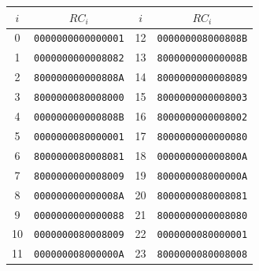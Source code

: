 \begin{tabular}{|c|c||c|c|}
\hline
\cellcolor{gray!30}$i$ & \cellcolor{gray!30}$RC_i$ & \cellcolor{gray!30}$i$ & \cellcolor{gray!30}$RC_i$ \\ \hline
0 & \texttt{0000000000000001} & 12 & \texttt{000000008000808B} \\ \hline
1 & \texttt{0000000000008082} & 13 & \texttt{800000000000008B} \\ \hline
2 & \texttt{800000000000808A} & 14 & \texttt{8000000000008089} \\ \hline
3 & \texttt{8000000080008000} & 15 & \texttt{8000000000008003} \\ \hline
4 & \texttt{000000000000808B} & 16 & \texttt{8000000000008002} \\ \hline
5 & \texttt{0000000080000001} & 17 & \texttt{8000000000000080} \\ \hline
6 & \texttt{8000000080008081} & 18 & \texttt{000000000000800A} \\ \hline
7 & \texttt{8000000000008009} & 19 & \texttt{800000008000000A} \\ \hline
8 & \texttt{000000000000008A} & 20 & \texttt{8000000080008081} \\ \hline
9 & \texttt{0000000000000088} & 21 & \texttt{8000000000008080} \\ \hline
10 & \texttt{0000000080008009} & 22 & \texttt{0000000080000001} \\ \hline
11 & \texttt{000000008000000A} & 23 & \texttt{8000000080008008} \\ \hline
\end{tabular}
